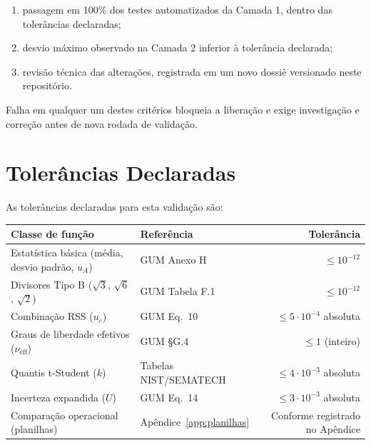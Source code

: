 \documentclass[11pt,a4paper]{article}
\begin{document}
\begin{enumerate}
  \item passagem em 100\% dos testes automatizados da Camada 1, dentro das tolerâncias declaradas;
  \item desvio máximo observado na Camada 2 inferior à tolerância declarada;
  \item revisão técnica das alterações, registrada em um novo dossiê versionado neste repositório.
\end{enumerate}

Falha em qualquer um destes critérios bloqueia a liberação e exige investigação e correção antes de nova rodada de validação.

\section{Tolerâncias Declaradas}
\label{sec:tolerancias}

As tolerâncias declaradas para esta validação são:

\begin{table}[h]
  \centering
  \small
  \begin{tabularx}{\textwidth}{l X r}
    \toprule
    \textbf{Classe de função} & \textbf{Referência} & \textbf{Tolerância} \\
    \midrule
    Estatística básica (média, desvio padrão, \(u_A\))             & GUM Anexo H            & \(\leq 10^{-12}\) \\
    Divisores Tipo B (\(\sqrt{3}\), \(\sqrt{6}\), \(\sqrt{2}\))    & GUM Tabela F.1         & \(\leq 10^{-12}\) \\
    Combinação RSS (\(u_c\))                                       & GUM Eq.~10             & \(\leq 5 \cdot 10^{-4}\) absoluta \\
    Graus de liberdade efetivos (\(\nu_\text{eff}\))               & GUM §G.4               & \(\leq 1\) (inteiro) \\
    Quantis t-Student (\(k\))                                      & Tabelas NIST/SEMATECH  & \(\leq 4 \cdot 10^{-3}\) absoluta \\
    Incerteza expandida (\(U\))                                    & GUM Eq.~14             & \(\leq 3 \cdot 10^{-3}\) absoluta \\
    Comparação operacional (planilhas)                             & Apêndice~\ref{app:planilhas} & Conforme registrado no Apêndice \\
    \bottomrule
  \end{tabularx}
\end{table}
\end{document}

